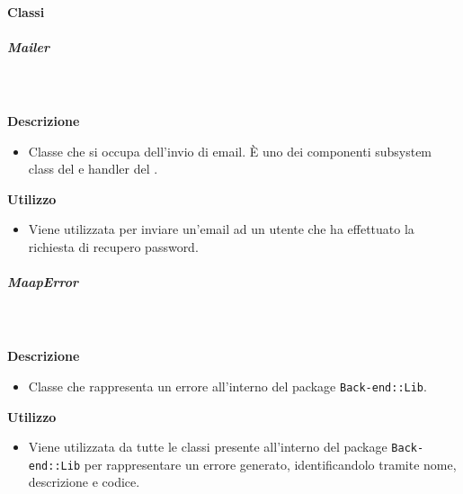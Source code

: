 		\paragraph{Classi}
			\subparagraph{Mailer}
				
				\textbf{\\ \\ Descrizione} 
					\begin{itemize}
						\item[] Classe che si occupa dell'invio di email. È uno dei componenti subsystem class del   e handler del  .
					\end{itemize}      
				\textbf{Utilizzo}  
					\begin{itemize}
						\item[] Viene utilizzata per inviare un'email ad un utente che ha effettuato la richiesta di recupero password.
					\end{itemize}
			\subparagraph{MaapError}
				
				\textbf{\\ \\ Descrizione} 
					\begin{itemize}
						\item[] Classe che rappresenta un errore all'interno del package \texttt{Back-end::Lib}.
					\end{itemize}      
				\textbf{Utilizzo}  
					\begin{itemize}
						\item[] Viene utilizzata da tutte le classi presente all'interno del package \texttt{Back-end::Lib} per rappresentare un errore generato, identificandolo tramite nome, descrizione e codice.
					\end{itemize}